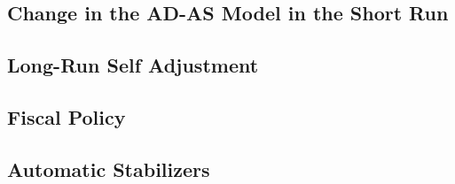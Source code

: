 \documentclass{beamer}
\begin{document}
  \begin{frame}
	\section{Change in the AD-AS Model in the Short Run}
  \end{frame}
  \begin{frame}
	\section{Long-Run Self Adjustment}
  \end{frame}
  \begin{frame}
	\section{Fiscal Policy}
  \end{frame}
  \begin{frame}
	\section{Automatic Stabilizers}
  \end{frame}
\end{document}

